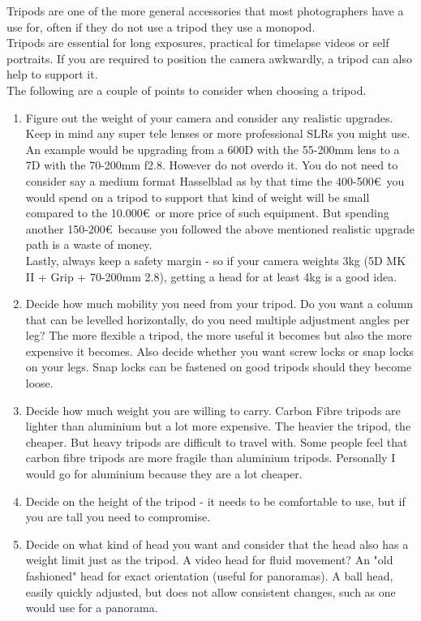 Tripods are one of the more general accessories that most photographers have a use for, often if they do not use a tripod they use a monopod.
\\
Tripods are essential for long \glspl{exposure}, practical for \gls{timelapse} videos or self portraits. If you are required to position the camera awkwardly, a tripod can also help to support it.
\\[\baselineskip]
The following are a couple of points to consider when choosing a tripod.
\begin{enumerate}[i]
	\item Figure out the weight of your camera and consider any realistic upgrades.
	\\
	Keep in mind any super tele lenses or more professional SLRs you might use. An example would be upgrading from a 600D with the 55-200mm lens to a 7D with the 70-200mm f2.8. However do not overdo it. You do not need to consider say a medium format Hasselblad as by that time the 400-500\euro\ you would spend on a tripod to support that kind of weight will be small compared to the 10.000\euro\ or more price of such equipment. But spending another 150-200\euro\ because you followed the above mentioned realistic upgrade path is a waste of money. 
\\
Lastly, always keep a safety margin - so if your camera weights 3kg (5D MK II + Grip + 70-200mm 2.8), getting a head for at least 4kg is a good idea.
  \item Decide how much mobility you need from your tripod. Do you want a column that can be levelled horizontally, do you need multiple adjustment angles per leg? The more flexible a tripod, the more useful it becomes but also the more expensive it becomes. Also decide whether you want screw locks or snap locks on your legs. Snap locks can be fastened on good tripods should they become loose.
	\item Decide how much weight you are willing to carry. Carbon Fibre tripods are lighter than aluminium but a lot more expensive. The heavier the tripod, the cheaper. But heavy tripods are difficult to travel with.
Some people feel that carbon fibre tripods are more fragile than aluminium tripods. Personally I would go for aluminium because they are a lot cheaper.
	\item Decide on the height of the tripod - it needs to be comfortable to use, but if you are tall you need to compromise.
	\item Decide on what kind of head you want and consider that the head also has a weight limit just as the tripod.
	\subitem A video head for fluid movement?
	\subitem An "old fashioned" head for exact orientation (useful for panoramas).
	\subitem A ball head, easily quickly adjusted, but does not allow consistent changes,  such as one would use for a panorama.
\end{enumerate}

